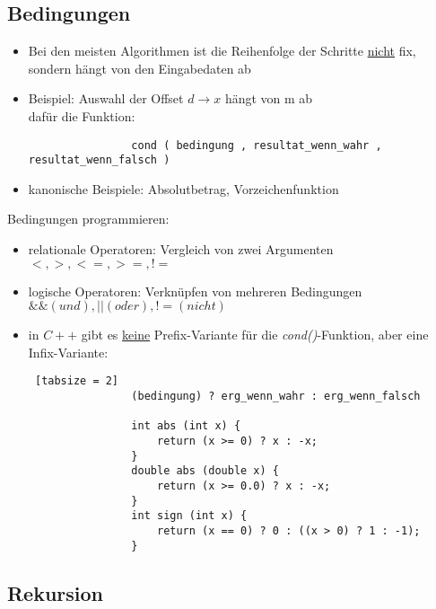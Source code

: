 \documentclass{article}
\begin{document}
	 	\subsection{Bedingungen}
	 	\begin{itemize}
	 		\item Bei den meisten Algorithmen ist die Reihenfolge der Schritte \underline{nicht} fix, sondern hängt von den Eingabedaten ab
	 		\item Beispiel: Auswahl der Offset $d \rightarrow x$ hängt von m ab \\
	 		dafür die Funktion:
	 		\begin{lstlisting}
	 			cond ( bedingung , resultat_wenn_wahr , resultat_wenn_falsch )
	 		\end{lstlisting}
	 		\item kanonische Beispiele: Absolutbetrag, Vorzeichenfunktion
	 	\end{itemize}
	 	
	 	Bedingungen programmieren:
	 	\begin{itemize}
	 		\item relationale Operatoren: Vergleich von zwei Argumenten \\ $< , > , <= , >= , !=$
	 		\item logische Operatoren: Verknüpfen von mehreren Bedingungen \\
		 		$ \&\& (und), || (oder), != (nicht)$
		 	\item in $C++$ gibt es \underline{keine} Prefix-Variante für die \textit{cond()}-Funktion, aber eine Infix-Variante:
		 	\begin{lstlisting} [tabsize = 2]
				(bedingung) ? erg_wenn_wahr : erg_wenn_falsch
				
				int abs (int x) {
					return (x >= 0) ? x : -x;
				}
				double abs (double x) {
					return (x >= 0.0) ? x : -x;
				}
				int sign (int x) {
					return (x == 0) ? 0 : ((x > 0) ? 1 : -1);
				}
		 	\end{lstlisting}
	 	\end{itemize}
	 	
	 	\subsection{Rekursion}
	 	
\end{document}
